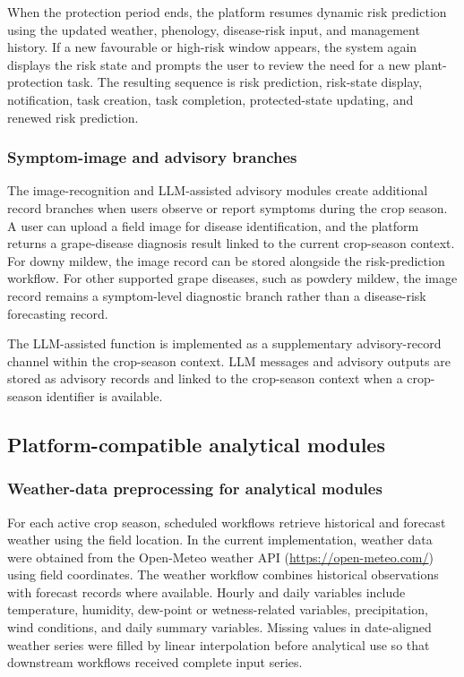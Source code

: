 \documentclass[12pt]{article}
\begin{document}
When the protection period ends, the platform resumes dynamic risk prediction using the updated weather, phenology, disease-risk input, and management history. If a new favourable or high-risk window appears, the system again displays the risk state and prompts the user to review the need for a new plant-protection task. The resulting sequence is risk prediction, risk-state display, notification, task creation, task completion, protected-state updating, and renewed risk prediction.

\subsubsection{Symptom-image and advisory branches}\label{symptom-image-and-advisory-branches}

The image-recognition and LLM-assisted advisory modules create additional record branches when users observe or report symptoms during the crop season. A user can upload a field image for disease identification, and the platform returns a grape-disease diagnosis result linked to the current crop-season context. For downy mildew, the image record can be stored alongside the risk-prediction workflow. For other supported grape diseases, such as powdery mildew, the image record remains a symptom-level diagnostic branch rather than a disease-risk forecasting record.

The LLM-assisted function is implemented as a supplementary advisory-record channel within the crop-season context. LLM messages and advisory outputs are stored as advisory records and linked to the crop-season context when a crop-season identifier is available.

\subsection{Platform-compatible analytical modules}\label{analytical-modules-operationalized-in-grapemaster}

\subsubsection{Weather-data preprocessing for analytical modules}\label{weather-data-preprocessing-for-analytical-modules}

For each active crop season, scheduled workflows retrieve historical and forecast weather using the field location. In the current implementation, weather data were obtained from the Open-Meteo weather API (\url{https://open-meteo.com/}) using field coordinates. The weather workflow combines historical observations with forecast records where available. Hourly and daily variables include temperature, humidity, dew-point or wetness-related variables, precipitation, wind conditions, and daily summary variables. Missing values in date-aligned weather series were filled by linear interpolation before analytical use so that downstream workflows received complete input series.
\end{document}
